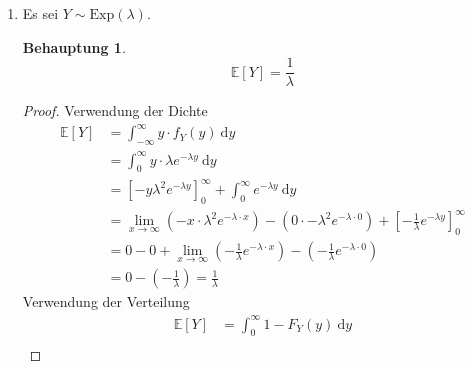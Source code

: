 \documentclass[a4paper]{scrartcl}
\newtheorem*{behaupt}{Behauptung}
\newcommand{\dif}{\ \mathrm{d}}
\newcommand{\e}{\mathbb{E}}
\def \blattnr {4}
\begin{document}
\begin{enumerate}[label=\bfseries \blattnr.\arabic*]
\begin{enumerate}
            \item
                Es sei $Y \sim \text{Exp}(\lambda)$.
                \begin{behaupt}
                    \begin{equation*}
                        \e[Y] = \frac{1}{\lambda}
                    \end{equation*}
                \end{behaupt}
                \begin{proof}
                    Verwendung der Dichte
                    \begin{equation*}
                        \begin{split}
                            \e[Y]
                            &= \int_{-\infty}^\infty y \cdot f_Y(y) \dif y \\
                            &= \int_0^\infty y \cdot
                                \lambda e^{-\lambda y} \dif y \\
                            &= \left[ -y \lambda^2 e^{-\lambda y}
                                \right]_0^\infty
                                + \int_0^\infty e^{-\lambda y} \dif y \\
                            &= \lim_{x \to \infty} \left( -x \cdot \lambda^2
                                e^{-\lambda \cdot x} \right)
                                - \left( 0 \cdot -\lambda^2
                                e^{-\lambda \cdot 0} \right)
                                + \left[ -\frac{1}{\lambda} e^{-\lambda y}
                                \right]_0^\infty \\
                            &= 0 -  0 + \lim_{x \to \infty}
                                \left( -\frac{1}{\lambda} e^{-\lambda \cdot x}
                                \right) - \left( -\frac{1}{\lambda}
                                e^{-\lambda \cdot 0} \right) \\
                            &= 0 - \left(- \frac{1}{\lambda}\right)
                             = \frac{1}{\lambda}
                        \end{split}
                    \end{equation*}
                    Verwendung der Verteilung
                    \begin{equation*}
                        \begin{split}
                            \e[Y]
                            &= \int_0^\infty 1 - F_Y(y) \dif y \\

\end{split}
\end{equation*}
\end{proof}
\end{enumerate}
\end{enumerate}
\end{document}
